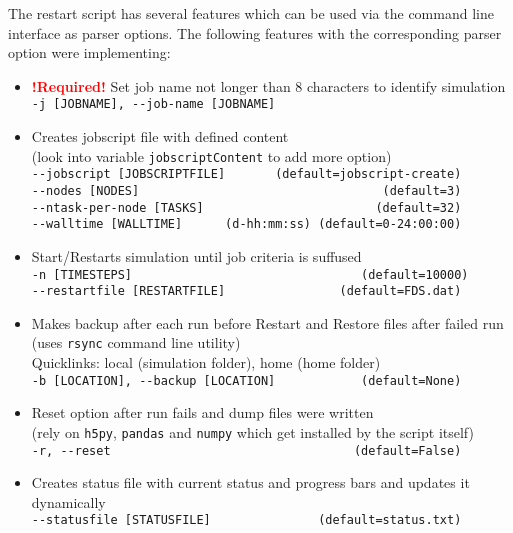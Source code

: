 The restart script has several features which can be used via the command line interface as parser options. The following features with the corresponding parser option were implementing:
\begin{itemize}
    \item \textbf{\textcolor{red}{!Required!}} Set job name not longer than 8 characters to identify simulation\\
          \texttt{-j [JOBNAME], -\/-job-name [JOBNAME]}
    \item Creates jobscript file with defined content\\
          (look into variable \texttt{jobscriptContent} to add more option) \\
          \texttt{-\/-jobscript [JOBSCRIPTFILE]~~~~~~~(default=jobscript-create)}\\
          \texttt{-\/-nodes [NODES]~~~~~~~~~~~~~~~~~~~~~~~~~~~~~~~~~~(default=3)}\\
          \texttt{-\/-ntask-per-node [TASKS]~~~~~~~~~~~~~~~~~~~~~~~~(default=32)}\\
          \texttt{-\/-walltime [WALLTIME]~~~~~~(d-hh:mm:ss)~(default=0-24:00:00)}
    \item Start/Restarts simulation until job criteria is suffused\\
          \texttt{-n [TIMESTEPS]~~~~~~~~~~~~~~~~~~~~~~~~~~~~~~\,\,(default=10000)}\\
          \texttt{-\/-restartfile [RESTARTFILE]~~~~~~~~~~~~~~~~(default=FDS.dat)}
    \item Makes backup after each run before Restart and Restore files after failed run\\
          (uses \texttt{rsync} command line utility)\\
          Quicklinks: local (simulation folder), home (home folder) \\
          \texttt{-b [LOCATION], -\/-backup [LOCATION]~~~~~~~~~~~\,(default=None)}
    \item Reset option after run fails and dump files were written\\
          (rely on \texttt{h5py}, \texttt{pandas} and \texttt{numpy} which get installed by the script itself)\\
          \texttt{-r, -\/-reset~~~~~~~~~~~~~~~~~~~~~~~~~~~~~~~~~\,(default=False)}
    \item Creates status file with current status and progress bars and updates it dynamically\\
          \texttt{-\/-statusfile [STATUSFILE]~~~~~~~~~~~~~~~(default=status.txt)}

\end{itemize}
